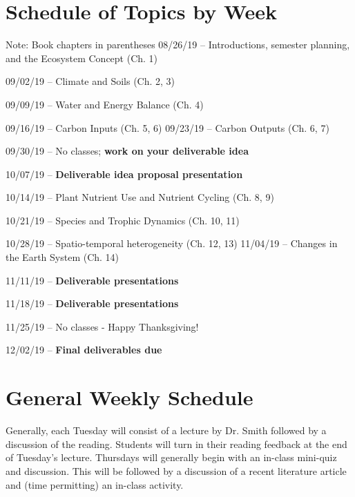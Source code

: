 \documentclass[12pt, notitlepage]{article}   	%
\begin{document}
{\section*{Schedule of Topics by Week}
Note: Book chapters in parentheses
08/26/19 – Introductions, semester planning, and the Ecosystem Concept (Ch. 1) \par
09/02/19 – Climate and Soils (Ch. 2, 3) \par
09/09/19 – Water and Energy Balance (Ch. 4) \par
09/16/19 – Carbon Inputs (Ch. 5, 6)
09/23/19 – Carbon Outputs (Ch. 6, 7) \par
09/30/19 – No classes; \textbf{work on your deliverable idea} \par
10/07/19 – \textbf{Deliverable idea proposal presentation} \par
10/14/19 – Plant Nutrient Use and Nutrient Cycling (Ch. 8, 9) \par
10/21/19 – Species and Trophic Dynamics (Ch. 10, 11) \par
10/28/19 – Spatio-temporal heterogeneity (Ch. 12, 13)
11/04/19 – Changes in the Earth System (Ch. 14) \par
11/11/19 – \textbf{Deliverable presentations} \par
11/18/19 – \textbf{Deliverable presentations} \par
11/25/19 – No classes - Happy Thanksgiving! \par
12/02/19 – \textbf{Final deliverables due} \par

\section*{General Weekly Schedule}
Generally, each Tuesday will consist of a lecture by Dr. Smith followed by a discussion
of the reading. Students will turn in their reading
feedback at the end of Tuesday's lecture. Thursdays will generally begin with an in-class
mini-quiz and discussion. 
This will be followed by a discussion of a recent literature article and
(time permitting) an in-class activity.

} %
\end{document}
